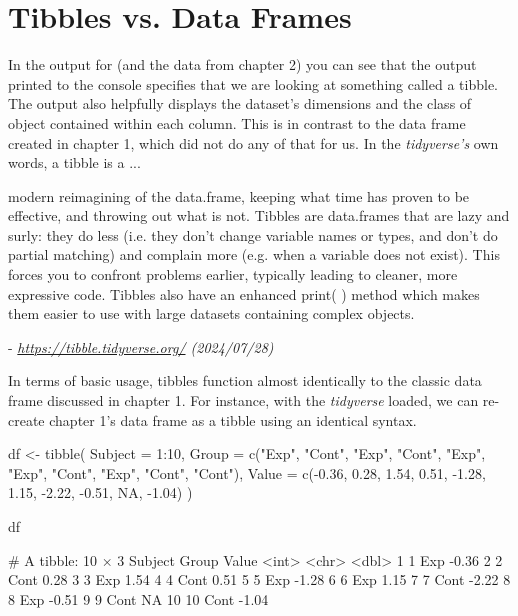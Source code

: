 \clearpage

\section{Tibbles vs. Data Frames}

In the output for  (and the  data from chapter 2) you can see that the output printed to the console specifies that we are looking at something called a \gls{tibble}. The output also helpfully displays the dataset's dimensions and the class of object contained within each column. This is in contrast to the data frame created in chapter 1, which did not do any of that for us. In the \textit{tidyverse's} own words, a tibble is a ...

\begin{displayquote}
\headingfont
modern reimagining of the data.frame, keeping what time has proven to be effective, and throwing out what is not. Tibbles are data.frames that are lazy and surly: they do less (i.e. they don’t change variable names or types, and don’t do partial matching) and complain more (e.g. when a variable does not exist). This forces you to confront problems earlier, typically leading to cleaner, more expressive code. Tibbles also have an enhanced print( ) method which makes them easier to use with large datasets containing complex objects.

- \textit{\url{https://tibble.tidyverse.org/} (2024/07/28)}

\end{displayquote}

In terms of basic usage, tibbles function almost identically to the classic data frame discussed in chapter 1. For instance, with the \textit{tidyverse} loaded, we can re-create chapter 1's data frame as a tibble using an identical syntax.

\begin{inR}
df <- tibble(
  Subject = 1:10,
  Group = c("Exp", "Cont", "Exp", "Cont", "Exp", "Exp",
            "Cont", "Exp", "Cont", "Cont"),
  Value = c(-0.36,  0.28,  1.54,  0.51, -1.28,  1.15,
            -2.22, -0.51,  NA, -1.04)
)

df
\end{inR}

\begin{outR}
# A tibble: 10 × 3
   Subject Group Value
     <int> <chr> <dbl>
 1       1 Exp   -0.36
 2       2 Cont   0.28
 3       3 Exp    1.54
 4       4 Cont   0.51
 5       5 Exp   -1.28
 6       6 Exp    1.15
 7       7 Cont  -2.22
 8       8 Exp   -0.51
 9       9 Cont  NA   
10      10 Cont  -1.04
\end{outR}

